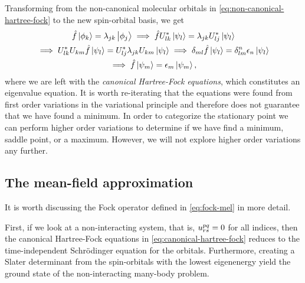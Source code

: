             Transforming from the non-canonical molecular orbitals in
            \autoref{eq:non-canonical-hartree-fock} to the new spin-orbital
            basis, we get
            \begin{gather}
                \hat{f}\ket{\phi_k} = \lambda_{jk}\ket{\phi_j}
                \implies
                \hat{f} U^{*}_{lk}\ket{\psi_{l}}
                = \lambda_{jk} U^{*}_{lj} \ket{\psi_l}
                \\
                \implies
                U^{*}_{lk} U_{km} \hat{f}\ket{\psi_l}
                = U^{*}_{lj} \lambda_{jk} U_{km} \ket{\psi_l}
                \implies
                \delta_{ml} \hat{f} \ket{\psi_l}
                = \delta^{n}_{lm} \epsilon_{n} \ket{\psi_l}
                \\
                \implies
                \hat{f}\ket{\psi_m}
                = \epsilon_{m} \ket{\psi_m},
                \label{eq:canonical-hartree-fock}
            \end{gather}
            where we are left with the \emph{canonical Hartree-Fock equations},
            which constitutes an eigenvalue equation.
            It is worth re-iterating that the equations were found from first
            order variations in the variational principle and therefore does not
            guarantee that we have found a minimum.
            In order to categorize the stationary point we can perform higher order
            variations to determine if we have find a minimum, saddle point, or
            a maximum.
            However, we will not explore higher order variations any further.

        \subsection{The mean-field approximation}
            It is worth discussing the Fock operator defined in
            \autoref{eq:fock-mel} in more detail.

            First, if we look at a non-interacting system, that is,
            $u^{pq}_{rs} = 0$ for all indices, then the canonical
            Hartree-Fock equations in \autoref{eq:canonical-hartree-fock}
            reduces to the time-independent Schrödinger equation for the
            orbitals.
            Furthermore, creating a Slater determinant from the spin-orbitals
            with the lowest eigenenergy yield the ground state of the
            non-interacting many-body problem.

